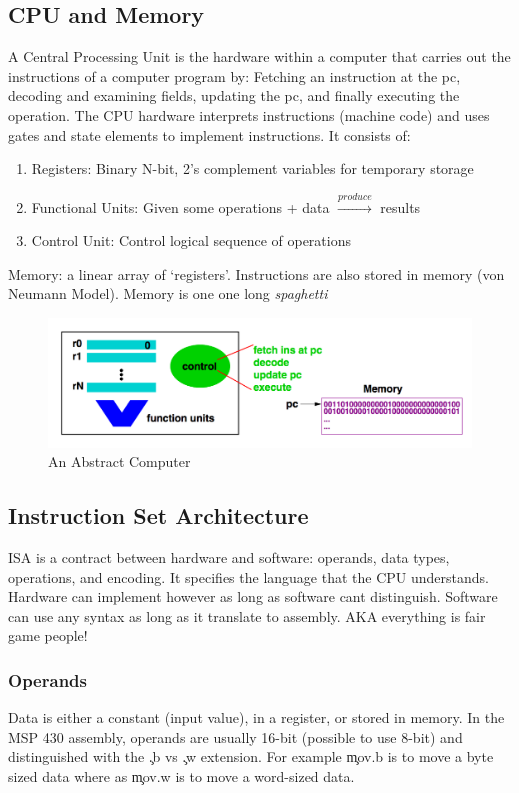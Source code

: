 \documentclass{hw}
\begin{document}
\subsection{CPU and Memory}
A Central Processing Unit is the hardware within a computer that carries out the
instructions of a computer program by: Fetching an instruction at the pc, decoding and 
examining fields, updating the pc, and finally executing the operation. The CPU 
hardware interprets instructions (machine code) and uses gates and state elements to implement 
instructions. It consists of:
\begin{enumerate}
\item Registers: Binary N-bit, 2's complement variables for temporary storage
\item Functional Units: Given some operations + data $\xrightarrow{produce}$ results
\item Control Unit: Control logical sequence of operations
\end{enumerate}

Memory: a linear array of `registers'. Instructions are also stored in memory 
(von Neumann Model). Memory is one one long \emph{spaghetti}

\begin{figure}[H]
  \centering
  \includegraphics[scale=.7]{img/absComp}
  \caption{An Abstract Computer}
\end{figure}


\subsection{Instruction Set Architecture}
ISA is a contract between hardware and software: operands, data types, operations,
and encoding. It specifies the language that the CPU understands. Hardware can 
implement however as long as software cant distinguish. Software can use any syntax
as long as it translate to assembly. AKA everything is fair game people!

\subsubsection{Operands}
Data is either a constant (input value), in a register, or stored in memory. In 
the MSP 430 assembly, operands are usually 16-bit (possible to use 8-bit) and
distinguished with the \c{.b} vs \c{.w} extension. For example \c{mov.b} is to move a byte 
sized data where as \c{mov.w} is to move a word-sized data.
\end{document}
